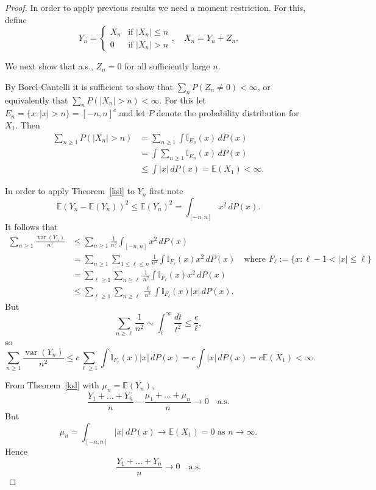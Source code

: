 \documentclass[a4paper]{amsart}
\theoremstyle{plain}
\theoremstyle{definition}
\theoremstyle{remark}
\DeclareMathOperator{\var}{var}
\begin{document}
\begin{proof} In order to apply previous results we need a moment restriction.  For this, define
\[
Y_n = \begin{cases} X_n &\text{if } |X_n|\leq n \\
                                     0 &\text{if } |X_n |> n
           \end{cases}, \quad X_n = Y_n + Z_n.
\]

\medskip We next show that a.s.,  $ Z_n = 0 $ for all sufficiently large $ n $. 

By Borel-Cantelli it is sufficient to show that 
$ \sum_n P(Z_n \neq 0) < \infty $, or equivalently that $ \sum_n P(|X_n|>n ) < \infty $.
For this let $ E_n = \{ x : |x|> n \} = [-n,n]^c$ and let $ P $ denote the probability distribution for $ X_1 $.  Then
\begin{align*} 
 \sum_{n\geq 1} P(|X_n|>n ) &=  \sum_{n\geq 1} \int \mathbb{I}_{E_n} (x) \, dP(x) \\
     &= \int \sum_{n\geq 1}  \mathbb{I}_{E_n} (x) \, dP(x) \\
     &\leq \int |x|\, dP(x) = \mathbb{E} (X_1) < \infty.
     \end{align*} 

\medskip  In order to apply Theorem~\ref{ksl} to $ Y_n $ first note
\[
\mathbb{E} (Y_n - \mathbb{E} (Y_n))^2 \leq \mathbb{E} (Y_n)^2 = \int_{[-n,n]}x^2 \, dP(x).
\]
It follows that
\begin{align*}
\sum_{n\geq 1} \frac{\var(Y_n)}{n^2} &\leq \sum_{n\geq 1} \frac{1}{n^2}\int_{[-n,n]}x^2 \, dP(x) \\
         &= \sum_{n\geq 1} \sum_{1\leq \ell \leq n}  \frac{1}{n^2}\int \mathbb{I}_{F_\ell} (x) x^2 \, dP(x) \quad \text{where } F_\ell := \{ x : \ell-1 < |x|\leq \ell \} \\
         &= \sum_{\ell \geq 1} \sum_{n \geq \ell} \frac{1}{n^2} \int  \mathbb{I}_{F_\ell} (x) x^2 \, dP(x) \\
         &\leq \sum_{\ell \geq 1} \sum_{n \geq \ell} \frac{\ell}{n^2} \int  \mathbb{I}_{F_\ell} (x) |x| \, dP(x) .
\end{align*} 
But
\[ 
 \sum_{n \geq \ell} \frac{1}{n^2} \sim \int _\ell ^\infty \frac{dt}{t^2} \leq \frac{c}{\ell},
\]
so
\[
\sum_{n\geq 1} \frac{\var(Y_n)}{n^2}  \leq  c \sum_{\ell \geq 1}  \int  \mathbb{I}_{F_\ell} (x) |x| \, dP(x) = c\int   |x| \, dP(x) = c \mathbb{E} (X_1) < \infty .
\]

From Theorem~\ref{ksl} with $ \mu_n = \mathbb{E} (Y_n) $, 
\[
\frac{Y_1+\dots+Y_n}{n} - \frac{\mu_1 + \dots + \mu_n}{n} \to 0 \quad \text{a.s.}
\]
But 
\[
 \mu_n = \int_{[-n,n]} |x|\, dP(x) \to \mathbb{E} (X_1) = 0 \text{ as } n \to \infty.
\]
Hence
\[
\frac{Y_1+\dots+Y_n}{n}  \to 0 \quad \text{a.s.}
\]
 

\end{proof}
\end{document}
